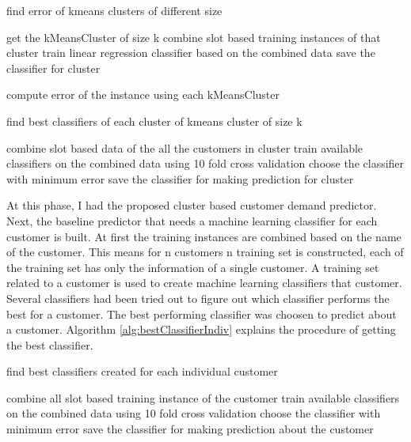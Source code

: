 \begin{algorithm}[!h]
\caption{find error of kmeans clusters of different size}
\begin{algorithmic} [1]

	\STATE get the kMeansCluster of size k
		\STATE combine slot based training instances of that cluster
		\STATE train linear regression classifier based on the combined data
		\STATE save the classifier for cluster
	\ENDFOR
\ENDFOR

	\STATE compute error of the instance using each kMeansCluster
\ENDFOR
\end{algorithmic}
\label{alg:errorOfCluster}
\end{algorithm}

\begin{algorithm} [!h]
\caption{find best classifiers of each cluster of kmeans cluster of size k}
\begin{algorithmic} [1]
	\STATE combine slot based data of the all the customers in cluster
	\STATE train available classifiers on the combined data using 10 fold cross validation
	\STATE choose the classifier with minimum error
	\STATE save the classifier for making prediction for cluster
\ENDFOR 
\end{algorithmic}
\label{alg:bestClassifierForCluster}
\end{algorithm}


At this phase, I had the proposed cluster based customer demand predictor. Next, the baseline predictor that needs a machine learning classifier for each customer is built. At first the training instances are combined based on the name of the customer. This means for n customers n training set is constructed, each of the training set has only the information of a single customer. A training set related to a customer is used to create machine learning classifiers that customer. Several classifiers had been tried out to figure out which classifier performs the best for a customer. The best performing classifier was choosen to predict about a customer. Algorithm \ref{alg:bestClassifierIndiv} explains the procedure of getting the best classifier.

\begin{algorithm}[!h]
\caption{find best classifiers created for each individual customer}
\begin{algorithmic} [1]
	\STATE combine all slot based training instance of the customer
	\STATE train available classifiers on the combined data using 10 fold cross validation
	\STATE choose the classifier with minimum error
	\STATE save the classifier for making prediction about the customer
\ENDFOR 
\end{algorithmic}
\label{alg:bestClassifierIndiv}
\end{algorithm}

